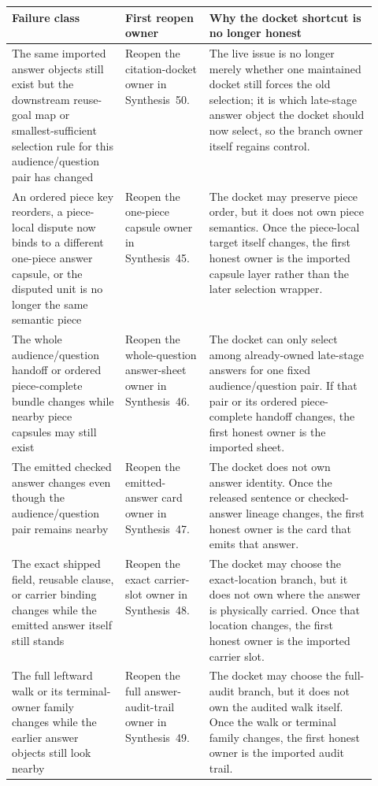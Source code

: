 \documentclass[11pt]{article}
\begin{document}
\begin{table}[t]
\centering
\small
\begin{tabularx}{\linewidth}{@{}p{0.31\linewidth}p{0.23\linewidth}X@{}}
\toprule
Failure class & First reopen owner & Why the docket shortcut is no longer honest \\
\midrule
The same imported answer objects still exist but the downstream reuse-goal map or smallest-sufficient selection rule for this audience/question pair has changed & Reopen the citation-docket owner in Synthesis~50. & The live issue is no longer merely whether one maintained docket still forces the old selection; it is which late-stage answer object the docket should now select, so the branch owner itself regains control. \\
An ordered piece key reorders, a piece-local dispute now binds to a different one-piece answer capsule, or the disputed unit is no longer the same semantic piece & Reopen the one-piece capsule owner in Synthesis~45. & The docket may preserve piece order, but it does not own piece semantics. Once the piece-local target itself changes, the first honest owner is the imported capsule layer rather than the later selection wrapper. \\
The whole audience/question handoff or ordered piece-complete bundle changes while nearby piece capsules may still exist & Reopen the whole-question answer-sheet owner in Synthesis~46. & The docket can only select among already-owned late-stage answers for one fixed audience/question pair. If that pair or its ordered piece-complete handoff changes, the first honest owner is the imported sheet. \\
The emitted checked answer changes even though the audience/question pair remains nearby & Reopen the emitted-answer card owner in Synthesis~47. & The docket does not own answer identity. Once the released sentence or checked-answer lineage changes, the first honest owner is the card that emits that answer. \\
The exact shipped field, reusable clause, or carrier binding changes while the emitted answer itself still stands & Reopen the exact carrier-slot owner in Synthesis~48. & The docket may choose the exact-location branch, but it does not own where the answer is physically carried. Once that location changes, the first honest owner is the imported carrier slot. \\
The full leftward walk or its terminal-owner family changes while the earlier answer objects still look nearby & Reopen the full answer-audit-trail owner in Synthesis~49. & The docket may choose the full-audit branch, but it does not own the audited walk itself. Once the walk or terminal family changes, the first honest owner is the imported audit trail. \\

\end{tabularx}
\end{table}
\end{document}
